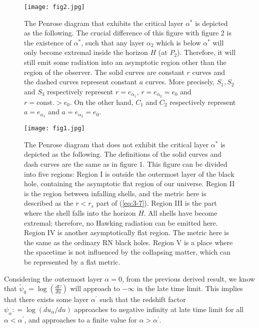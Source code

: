 \documentclass[letterpaper,12pt]{article}
\begin{document}
\begin{figure}[!tbp]

  \centering 
  \begin{minipage}[t]{0.4\textwidth} 
    \texttt{[image: fig2.jpg]}
    \caption{The Penrose diagram that exhibits the critical layer $\alpha^{*}$ is depicted as the following. The crucial difference of this figure with figure 2 is the existence of $\alpha^{*}$, such that any layer $\alpha_{2}$ which is below $\alpha^{*}$ will only become extremal inside the horizon $H$ (at $P_{2}$). Therefore, it will still emit some radiation into an asymptotic region other than the region of the observer. The solid curves are constant $r$ curves and the dashed curves represent constant $a$ curves. More precisely,   $S_{1}, S_{2}$ and $S_{3}$ respectively represent $r = e_{\alpha_{1}}$, $r = e_{\alpha_{2}}=e_{0}$ and $r = \textrm{const.} > e_{0}$. On the other hand, $C_{1}$ and $C_{2}$ respectively represent $a = e_{\alpha_{1}}$ and $ a = e_{\alpha_{2}} = e_{0}$.}
    \label{fig:1-2}  \end{minipage}
  \hfill
  \begin{minipage}[t]{0.4\textwidth}
    \texttt{[image: fig1.jpg]}
     \caption{The Penrose diagram that does not exhibit the critical layer $\alpha^{*}$ is depicted as the following. The 
     definitions of the solid curves and dash curves are the same as in figure 1.
    This figure can be divided into five regions:
    Region I is outside the outermost layer of the black hole, containing the asymptotic flat region of our universe. Region II is the region between infalling shells, and the metric here is described as the $r<r_{s}$ part of (\ref{eq:3-7}). Region III is the part where the shell falls into the horizon $H$. All shells have become extremal; therefore, no Hawking radiation can be emitted here. Region IV is another asymptotically flat region. The metric here is the same as the ordinary RN black holes. Region V is a place where the spacetime is not influenced by the collapsing matter, which can be represented by a flat metric. }
    
    \label{fig:1-1}
  \end{minipage}
\end{figure}

Considering the outermost layer $\alpha = 0$, from the previous derived result, we know that $\tilde{\psi}_{0} = \log(\frac{dU}{du})$ will approach to $-\infty$ in the late time limit. This implies that there exists some layer $\alpha^{\prime}$ such that the redshift factor $\psi_{\alpha} : = \log(du_{\alpha}/du)$ approaches to negative infinity at late time limit for all $\alpha < \alpha^{\prime}$, and approaches to a finite value for $\alpha > \alpha^{\prime}$.
\end{document}
